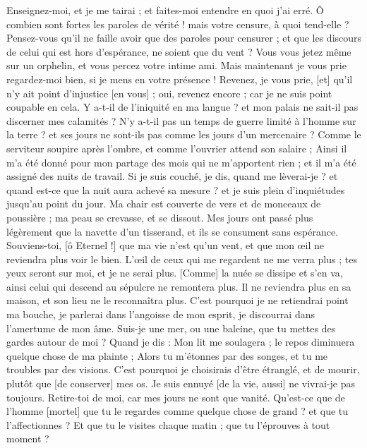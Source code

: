 \begin{multicols}{2}
Enseignez-moi, et je me tairai ; et faites-moi entendre en quoi j'ai erré.
Ô combien sont fortes les paroles de vérité ! mais votre censure, à quoi tend-elle ?
Pensez-vous qu'il ne faille avoir que des paroles pour censurer ; et que les discours de celui qui est hors d'espérance, ne soient que du vent ?
Vous vous jetez même sur un orphelin, et vous percez votre intime ami.
Mais maintenant je vous prie regardez-moi bien, si je mens en votre présence !
Revenez, je vous prie, [et] qu'il n'y ait point d'injustice [en vous] ; oui, revenez encore ; car je ne suis point coupable en cela.
Y a-t-il de l'iniquité en ma langue ? et mon palais ne sait-il pas discerner mes calamités ?
\VerseOne{}N'y a-t-il pas un temps de guerre limité à l'homme sur la terre ? et ses jours ne sont-ils pas comme les jours d'un mercenaire ?
Comme le serviteur soupire après l'ombre, et comme l'ouvrier attend son salaire ;
Ainsi il m'a été donné pour mon partage des mois qui ne m'apportent rien ; et il m'a été assigné des nuits de travail.
Si je suis couché, je dis, quand me lèverai-je ? et quand est-ce que la nuit aura achevé sa mesure ? et je suis plein d'inquiétudes jusqu'au point du jour.
Ma chair est couverte de vers et de monceaux de poussière ; ma peau se crevasse, et se dissout.
Mes jours ont passé plus légèrement que la navette d'un tisserand, et ils se consument sans espérance.
Souviens-toi, [ô Eternel !] que ma vie n'est qu'un vent, et que mon œil ne reviendra plus voir le bien.
L'œil de ceux qui me regardent ne me verra plus ; tes yeux seront sur moi, et je ne serai plus.
[Comme] la nuée se dissipe et s'en va, ainsi celui qui descend au sépulcre ne remontera plus.
Il ne reviendra plus en sa maison, et son lieu ne le reconnaîtra plus.
C'est pourquoi je ne retiendrai point ma bouche, je parlerai dans l'angoisse de mon esprit, je discourrai dans l'amertume de mon âme.
Suis-je une mer, ou une baleine, que tu mettes des gardes autour de moi ?
Quand je dis : Mon lit me soulagera ; le repos diminuera quelque chose de ma plainte ;
Alors tu m'étonnes par des songes, et tu me troubles par des visions.
C'est pourquoi je choisirais d'être étranglé, et de mourir, plutôt que [de conserver] mes os.
Je suis ennuyé [de la vie, aussi] ne vivrai-je pas toujours. Retire-toi de moi, car mes jours ne sont que vanité.
Qu'est-ce que de l'homme [mortel] que tu le regardes comme quelque chose de grand ? et que tu l'affectionnes ?
Et que tu le visites chaque matin ; que tu l'éprouves à tout moment ?

\end{multicols}
